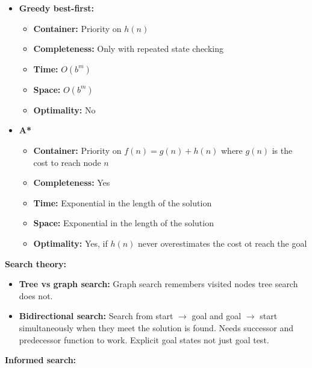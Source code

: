 \documentclass[12pt,a4paper]{article}
\begin{document}
\begin{itemize}
\begin{itemize}
        \item \textbf{Optimality:} Only if all step costs are equal
    \end{itemize}
    \item \textbf{Greedy best-first:}
    \begin{itemize}
        \item \textbf{Container:} Priority on $h(n)$
        \item \textbf{Completeness:} Only with repeated state checking
        \item \textbf{Time:} $O(b^{m})$
        \item \textbf{Space:} $O(b^{m})$
        \item \textbf{Optimality:} No
    \end{itemize}
    \item \textbf{A*}
    \begin{itemize}
        \item \textbf{Container:} Priority on $f(n) = g(n) + h(n)$ where $g(n)$ is the cost to reach node $n$
        \item \textbf{Completeness:} Yes
        \item \textbf{Time:} Exponential in the length of the solution
        \item \textbf{Space:} Exponential in the length of the solution
        \item \textbf{Optimality:} Yes, if $h(n)$ never overestimates the cost ot reach the goal
    \end{itemize}
\end{itemize}
\newpage
\textbf{Search theory:}
\begin{itemize}
    \item \textbf{Tree vs graph search:} Graph search remembers visited nodes tree search does not.
    \item \textbf{Bidirectional search:} Search from start $\rightarrow$ goal and goal $\rightarrow$ start simultaneously when they meet the solution is found. Needs successor and predecessor function to work. Explicit goal states not just goal test.
\end{itemize}
\vspace{10pt}
\textbf{Informed search:}  
\end{document}
